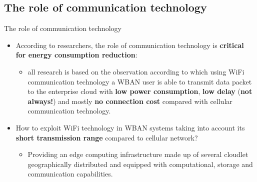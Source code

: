 \documentclass[10pt]{beamer}
\begin{document}
\subsection{The role of communication technology}
\begin{frame}{The role of communication technology} 

\begin{itemize}

\item According to researchers, the role of communication technology is \textbf{critical for energy consumption reduction}:
\begin{itemize}
\item all research is based on the observation according to which using WiFi communication technology a WBAN user is able to transmit data packet to the enterprise cloud with \textbf{low power consumption}, \textbf{low delay} (\textbf{not always!}) and mostly \textbf{no connection cost} compared with cellular communication technology. 
\end{itemize}

\item How to exploit WiFi technology in WBAN systems taking into account its \textbf{short transmission range} compared to cellular network?
\begin{itemize}
\item Providing an edge computing infrastructure made up of several cloudlet geographically distributed and equipped with computational, storage and communication capabilities.
\end{itemize}
\end{itemize}


\end{frame} 
\end{document}
